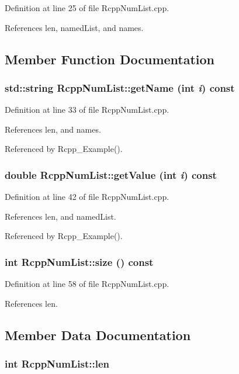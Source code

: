 Definition at line 25 of file RcppNumList.cpp.

References len, namedList, and names.

\subsection{Member Function Documentation}
\hypertarget{classRcppNumList_aabd02f34fb896791cb5ffb64f29d8f62}{
\subsubsection[{getName}]{\setlength{\rightskip}{0pt plus 5cm}std::string RcppNumList::getName (int {\em i}) const}}
\label{classRcppNumList_aabd02f34fb896791cb5ffb64f29d8f62}


Definition at line 33 of file RcppNumList.cpp.

References len, and names.

Referenced by Rcpp\_\-Example().\hypertarget{classRcppNumList_a20200d6f7e0daf7736675bcc6700d64c}{
\subsubsection[{getValue}]{\setlength{\rightskip}{0pt plus 5cm}double RcppNumList::getValue (int {\em i}) const}}
\label{classRcppNumList_a20200d6f7e0daf7736675bcc6700d64c}


Definition at line 42 of file RcppNumList.cpp.

References len, and namedList.

Referenced by Rcpp\_\-Example().\hypertarget{classRcppNumList_afb82fcc91a60ceca5a2dd389cf02f8fe}{
\subsubsection[{size}]{\setlength{\rightskip}{0pt plus 5cm}int RcppNumList::size () const}}
\label{classRcppNumList_afb82fcc91a60ceca5a2dd389cf02f8fe}


Definition at line 58 of file RcppNumList.cpp.

References len.

\subsection{Member Data Documentation}
\hypertarget{classRcppNumList_ac4cb5c784f7105f0f28ae48d02deb3a1}{
\subsubsection[{len}]{\setlength{\rightskip}{0pt plus 5cm}int {\bf RcppNumList::len}}}
\label{classRcppNumList_ac4cb5c784f7105f0f28ae48d02deb3a1}


